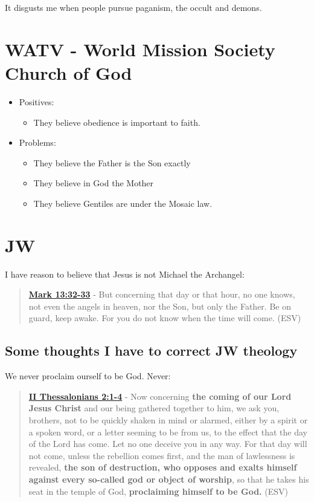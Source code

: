 \documentclass[11pt]{article}
\begin{document}
It disgusts me when people pursue paganism, the occult and demons.

\section{WATV - World Mission Society Church of God}
\label{sec:orgc50e06f}
\begin{itemize}
\item Positives:
\begin{itemize}
\item They believe obedience is important to faith.
\end{itemize}
\item Problems:
\begin{itemize}
\item They believe the Father is the Son exactly
\item They believe in God the Mother
\item They believe Gentiles are under the Mosaic law.
\end{itemize}
\end{itemize}

\section{JW}
\label{sec:org5230e90}
I have reason to believe that Jesus is not Michael the Archangel:

\begin{quote}
\textbf{\href{https://www.biblegateway.com/passage/?search=Mark\%2013\%3A32-33\&version=ESV}{Mark 13:32-33}} - But concerning that day or that hour, no one knows, not even the angels in heaven, nor the Son, but only the Father. Be on guard, keep awake. For you do not know when the time will come. (ESV)
\end{quote}

\subsection{Some thoughts I have to correct JW theology}
\label{sec:org3b9a3da}

We never proclaim ourself to be God. Never:

\begin{quote}
\textbf{\href{https://www.biblegateway.com/passage/?search=2\%20Thessalonians\%202\%3A1-4\&version=ESV}{II Thessalonians 2:1-4}} - Now concerning \textbf{the coming of our Lord Jesus Christ} and our being gathered together to him, we ask you, brothers, not to be quickly shaken in mind or alarmed, either by a spirit or a spoken word, or a letter seeming to be from us, to the effect that the day of the Lord has come. Let no one deceive you in any way. For that day will not come, unless the rebellion comes first, and the man of lawlessness is revealed, \textbf{the son of destruction, who opposes and exalts himself against every so-called god or object of worship}, so that he takes his seat in the temple of God, \textbf{proclaiming himself to be God.} (ESV)
\end{quote}
\end{document}
